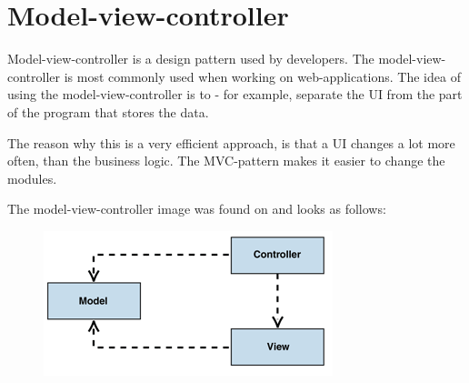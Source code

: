 \section{Model-view-controller}


Model-view-controller is a design pattern used by developers\cite{mvcasp}. The 
model-view-controller is most commonly used when working on web-applications\cite{mvcasp}. 
The idea of using the model-view-controller is to - for example, separate the UI from the 
part of the program that stores the data\cite{modelviewcontroller}. 

The reason why this is a very efficient approach, is that a UI changes a lot more often, 
than the business logic\cite{modelviewcontroller}. The MVC-pattern makes it easier to change 
the modules\cite{modelviewcontroller}.

The model-view-controller image was found on\cite{modelviewcontroller} and looks as follows:

\begin{figure}[h]
	\centering
		\includegraphics{design/figures/model-view-controller.png}
	\label{fig:model-view-controller}
\end{figure}



